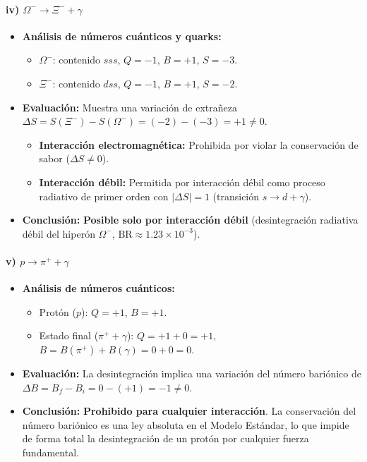 \begin{problema}
\paragraph{iv) $\Omega^- \longrightarrow \Xi^- + \gamma$}
\begin{itemize}
    \item \textbf{Análisis de números cuánticos y quarks:}
    \begin{itemize}
        \item $\Omega^-$: contenido $sss$, $Q=-1$, $B=+1$, $S=-3$.
        \item $\Xi^-$: contenido $dss$, $Q=-1$, $B=+1$, $S=-2$.
    \end{itemize}
    \item \textbf{Evaluación:} Muestra una variación de extrañeza $\Delta S = S(\Xi^-) - S(\Omega^-) = (-2) - (-3) = +1 \neq 0$.
    \begin{itemize}
        \item \textbf{Interacción electromagnética:} Prohibida por violar la conservación de sabor ($\Delta S \neq 0$).
        \item \textbf{Interacción débil:} Permitida por interacción débil como proceso radiativo de primer orden con $|\Delta S| = 1$ (transición $s \to d + \gamma$).
    \end{itemize}
    \item \textbf{Conclusión:} \textbf{Posible solo por interacción débil} (desintegración radiativa débil del hiperón $\Omega^-$, $\text{BR} \approx 1.23 \times 10^{-3}$).
\end{itemize}

\paragraph{v) $p \longrightarrow \pi^+ + \gamma$}
\begin{itemize}
    \item \textbf{Análisis de números cuánticos:}
    \begin{itemize}
        \item Protón ($p$): $Q=+1$, $B=+1$.
        \item Estado final ($\pi^+ + \gamma$): $Q = +1 + 0 = +1$, $B = B(\pi^+) + B(\gamma) = 0 + 0 = 0$.
    \end{itemize}
    \item \textbf{Evaluación:} La desintegración implica una variación del número bariónico de $\Delta B = B_f - B_i = 0 - (+1) = -1 \neq 0$.
    \item \textbf{Conclusión:} \textbf{Prohibido para cualquier interacción}. La conservación del número bariónico es una ley absoluta en el Modelo Estándar, lo que impide de forma total la desintegración de un protón por cualquier fuerza fundamental.
\end{itemize}
\end{problema}
